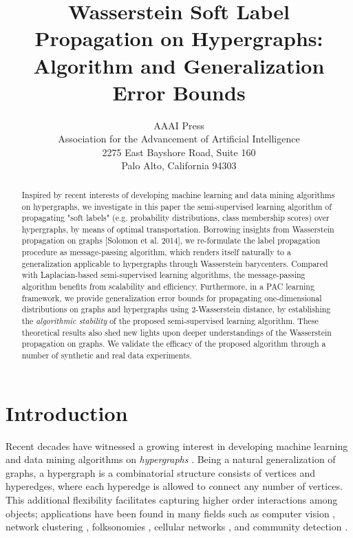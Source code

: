 \documentclass[letterpaper]{article} %
\begin{document}
\title{Wasserstein Soft Label Propagation on Hypergraphs: Algorithm and Generalization Error Bounds}
\author{AAAI Press\\
Association for the Advancement of Artificial Intelligence\\
2275 East Bayshore Road, Suite 160\\
Palo Alto, California 94303\\
}
\maketitle

\begin{abstract}
Inspired by recent interests of developing machine learning and data mining algorithms on hypergraphs, we investigate in this paper the semi-supervised learning algorithm of propagating "soft labels" (e.g. probability distributions, class membership scores) over hypergraphs, by means of optimal transportation. Borrowing insights from Wasserstein propagation on graphs [Solomon et al. 2014], we re-formulate the label propagation procedure as message-passing algorithm, which renders itself naturally to a generalization applicable to hypergraphs through Wasserstein barycenters. Compared with Laplacian-based semi-supervised learning algorithms, the message-passing algorithm benefits from scalability and efficiency. Furthermore, in a PAC learning framework, we provide generalization error bounds for propagating one-dimensional distributions on graphs and hypergraphs using 2-Wasserstein distance, by establishing the \textit{algorithmic stability} of the proposed semi-supervised learning algorithm. These theoretical results also shed new lights upon deeper understandings of the Wasserstein propagation on graphs. We validate the efficacy of the proposed algorithm through a number of synthetic and real data experiments.
\end{abstract}
	
\section{Introduction}
Recent decades have witnessed a growing interest in developing machine learning and data mining algorithms on \emph{hypergraphs} \cite{Hypergraph_Clustering,Hypergraph_Jost,Hypergraph_Game,Hypergraph_Kannan,Hypergraph_Olgica,Hypergraph_TV,HypergraphScalable}. Being a natural generalization of graphs, a hypergraph is a combinatorial structure consists of vertices and hyperedges, where each hyperedge is allowed to connect any number of vertices. This additional flexibility facilitates capturing higher order interactions among objects; applications have been found in many fields such as computer vision \cite{Govindu2005}, network clustering \cite{Hyper_Spatial}, folksonomies \cite{GZCN2009}, cellular networks \cite{KHT2009}, and community detection \cite{KBG2018}.
\end{document}
